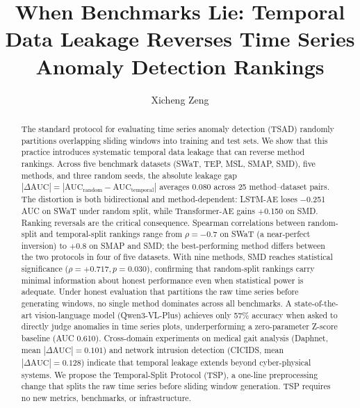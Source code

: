 \documentclass[preprint,12pt]{elsarticle}
\begin{document}
\begin{frontmatter}

\title{When Benchmarks Lie: Temporal Data Leakage Reverses Time Series Anomaly Detection Rankings}

\author[hnu]{Xicheng Zeng}



\begin{abstract}
The standard protocol for evaluating time series anomaly detection (TSAD) randomly partitions overlapping sliding windows into training and test sets. We show that this practice introduces systematic temporal data leakage that can reverse method rankings. Across five benchmark datasets (SWaT, TEP, MSL, SMAP, SMD), five methods, and three random seeds, the absolute leakage gap $|\Delta\text{AUC}| = |\text{AUC}_\text{random} - \text{AUC}_\text{temporal}|$ averages 0.080 across 25 method--dataset pairs. The distortion is both bidirectional and method-dependent: LSTM-AE loses $-$0.251 AUC on SWaT under random split, while Transformer-AE gains $+$0.150 on SMD. Ranking reversals are the critical consequence. Spearman correlations between random-split and temporal-split rankings range from $\rho = -0.7$ on SWaT (a near-perfect inversion) to $+0.8$ on SMAP and SMD; the best-performing method differs between the two protocols in four of five datasets. With nine methods, SMD reaches statistical significance ($\rho = +0.717, p = 0.030$), confirming that random-split rankings carry minimal information about honest performance even when statistical power is adequate. Under honest evaluation that partitions the raw time series before generating windows, no single method dominates across all benchmarks. A state-of-the-art vision-language model (Qwen3-VL-Plus) achieves only 57\% accuracy when asked to directly judge anomalies in time series plots, underperforming a zero-parameter Z-score baseline (AUC 0.610). Cross-domain experiments on medical gait analysis (Daphnet, mean $|\Delta\text{AUC}| = 0.101$) and network intrusion detection (CICIDS, mean $|\Delta\text{AUC}| = 0.128$) indicate that temporal leakage extends beyond cyber-physical systems. We propose the Temporal-Split Protocol (TSP), a one-line preprocessing change that splits the raw time series before sliding window generation. TSP requires no new metrics, benchmarks, or infrastructure.
\end{abstract}


\end{frontmatter}
\end{document}
